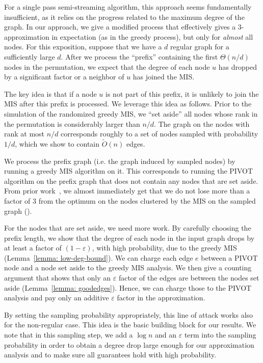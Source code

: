 \documentclass[10pt,a4paper]{article}
\newcommand{\pivot}{\textrm{PIVOT}\xspace}
\newcommand{\eps}{\ensuremath{\varepsilon}}
\begin{document}
For a single pass semi-streaming algorithm, this approach seems fundamentally insufficient, as it relies on the progress related to the maximum degree of the graph. In our approach, we give a modified process that effectively gives a $3$-approximation in expectation (as in the greedy process), but only for \emph{almost} all nodes.
For this exposition, suppose that we have a $d$ regular graph for a sufficiently large $d$.
After we process the ``prefix'' containing the first $\Theta(n/d)$ nodes in the permutation, we expect that the degree of each node $u$ has dropped by a significant factor or a neighbor of $u$ has joined the MIS.

The key idea is that if a node $u$ is not part of this prefix, it is unlikely to join the MIS after this prefix is processed.
We leverage this idea as follows.
Prior to the simulation of the randomized greedy MIS, we ``set aside'' all nodes whose rank in the permutation is considerably larger than $n/d$.
The graph on the nodes with rank at most $n/d$ corresponds roughly to a set of nodes sampled with probability $1 / d$, which we show to contain $\widetilde{O}(n)$ edges. 

We process the prefix graph (i.e. the graph induced by sampled nodes) by running a greedy MIS algorithm on it.
This corresponds to running the \pivot algorithm on the prefix graph that does not contain any nodes that are set aside.
From prior work~\cite{ailon2008aggregating}, we almost immediately get that we do not lose more than a factor of $3$ from the optimum on the nodes clustered by the MIS on the sampled graph ().


For the nodes that are set aside, we need more work. By carefully choosing the prefix length, we show that the degree of each node in the input graph drops by at least a factor of $(1 - \eps)$, with high probability, due to the greedy MIS (Lemma~\ref{lemma: low-deg-bound}).
We can charge each edge $e$ between a \pivot node and a node set aside to the greedy MIS analysis.
We then give a counting argument that shows that only an $\eps$ factor of the edges are between the nodes set aside (Lemma~\ref{lemma: goodedges}).
Hence, we can charge those to the \pivot analysis and pay only an additive $\eps$ factor in the approximation.

By setting the sampling probability appropriately, this line of attack works also for the non-regular case.
This idea is the basic building block for our results.
We note that in this sampling step, we add a $\log n$ and an $\eps$ term into the sampling probability in order to obtain a degree drop large enough for our approximation analysis and to make sure all guarantees hold with high probability.
\end{document}
